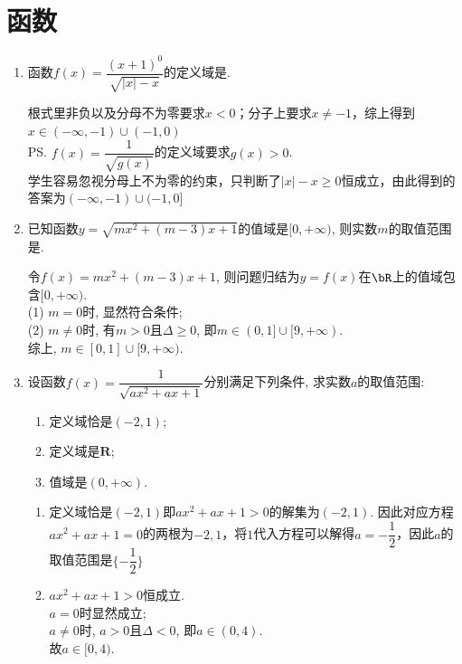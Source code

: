 \section*{函数}
\begin{enumerate}
    \item 函数$f(x)=\dfrac{(x+1)^0}{\sqrt{|x|-x}}$的定义域是.
    \begin{jieda}
    根式里非负以及分母不为零要求$x < 0$；分子上要求$x \neq -1$，综上得到$x \in (-\infty, -1) \cup (-1, 0)$ \\
    \ps $f(x) = \dfrac{1}{\sqrt{g(x)}}$的定义域要求$g(x) > 0$.\\
    学生容易忽视分母上不为零的约束，只判断了$|x| - x \geq 0$恒成立，由此得到的答案为$(-\infty, -1) \cup (-1, 0]$
    \end{jieda}
    \item 已知函数$y=\sqrt{mx^2+(m-3)x+1}$的值域是$[0,+\infty)$, 则实数$m$的取值范围是\blkda[2.5]{$[0,1]\cup[9,+\infty)$}. 
\begin{jieda}
令$f(x)=mx^2+(m-3)x+1$, 则问题归结为$y=f(x)$在$\bR$上的值域包含$[0,+\infty)$. \\
(1) $m=0$时, 显然符合条件; \\
(2) $m\neq 0$时, 有$m>0 \mbox{且} \Delta\geq 0$, 即$m\in(0,1]\cup[9,+\infty)$. \\
综上, $m\in[0,1]\cup[9,+\infty)$. 
\end{jieda}
    \item 设函数$f(x)=\dfrac{1}{\sqrt{ax^2+ax+1}}$分别满足下列条件, 求实数$a$的取值范围: 
\begin{enumerate}
\item 定义域恰是$(-2,1)$; 
\item 定义域是$\mathbf{R}$; 
\item 值域是$(0,+\infty)$. 
\end{enumerate}
\begin{jieda}
\begin{enumerate}
    \item 定义域恰是$(-2,1)$即$ax^2+ax+1>0$的解集为$(-2,1)$. 因此对应方程$ax^2+ax+1=0$的两根为$-2, 1$，将$1$代入方程可以解得$a = -\dfrac{1}{2}$，因此$a$的取值范围是$\{-\dfrac{1}{2}\}$
    
    \item $ax^2+ax+1>0$恒成立. \\
    $a=0$时显然成立; \\
    $a\neq 0$时, $a>0$且$ \Delta<0$, 即$a\in(0,4)$. \\
    故$a\in[0,4)$. 
    

\end{enumerate}
\end{jieda}
\end{enumerate}

